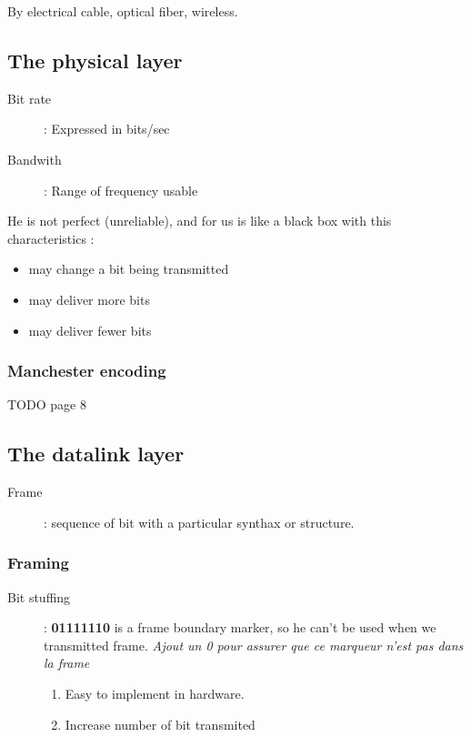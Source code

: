 \documentclass{report}
\begin{document}
By electrical cable, optical fiber, wireless.

\subsection{The physical layer}

\begin{description}
    \item[Bit rate] : Expressed in bits/sec
    \item[Bandwith] : Range of frequency usable 
\end{description}

He is not perfect (unreliable), and for us is like a black box with this characteristics :
\begin{itemize}
    \item may change a bit being transmitted
    \item may deliver more bits
    \item may deliver fewer bits
\end{itemize}

\subsubsection{Manchester encoding}
TODO page 8

\subsection{The datalink layer}

\begin{description}
    \item[Frame] : sequence of bit with a particular synthax or structure.
\end{description}

\subsubsection{Framing}

\begin{description}
    \item[Bit stuffing] : \textbf{01111110} is a frame boundary marker, so he can't
        be used when we transmitted frame. 
        \textit{Ajout un 0 pour assurer que ce marqueur n'est pas dans la frame}\\
        \begin{enumerate}
            \item Easy to implement in hardware.
            \item Increase number of bit transmited
        \end{enumerate}
\end{description}
\end{document}
